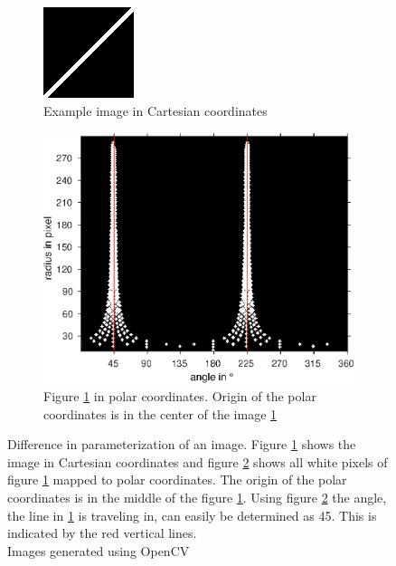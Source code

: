\documentclass[12pt,english,twocolumn]{revtex4}
\begin{document}
\begin{figure}[h]
    \centering
    \begin{subfigure}[b]{\linewidth}
        \includegraphics[width=.4\linewidth]{figures/polar_example.png}
        \caption{Example image in Cartesian coordinates}
        \label{subfig:cartesian}
    \end{subfigure}
    \begin{subfigure}[b]{\linewidth}
        \includegraphics[width=\linewidth]{figures/polar_viz.eps}
        \caption{Figure \ref{subfig:cartesian} in polar coordinates. Origin of the polar coordinates is in the center of the image \ref{subfig:cartesian}}
        \label{subfig:polar}
    \end{subfigure}%
    \caption{Difference in parameterization of an image. Figure \ref{subfig:cartesian} shows the image in Cartesian coordinates and figure \ref{subfig:polar} shows all white pixels of figure \ref{subfig:cartesian} mapped to polar coordinates. The origin of the polar coordinates is in the middle of the figure \ref{subfig:cartesian}. Using figure \ref{subfig:polar} the angle, the line in \ref{subfig:cartesian} is traveling in, can easily be determined as 45\degree. This is indicated by the red vertical lines.\\
       Images generated using OpenCV  \cite{opencv_library}}
    \label{fig:polar_parameterization}
\end{figure}
\end{document}
